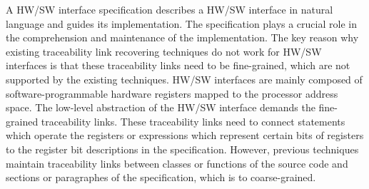 A HW/SW interface specification describes a HW/SW interface in natural language and guides its implementation.
The specification plays a crucial role in the comprehension and maintenance of the implementation.
The key reason why existing traceability link recovering techniques do not work for HW/SW interfaces is that these traceability links need to be fine-grained,
which are not supported by the existing techniques.
HW/SW interfaces are mainly composed of software-programmable hardware registers mapped to the processor address space.
The low-level abstraction of the HW/SW interface demands the fine-grained traceability links.
These traceability links need to connect statements which operate the registers or expressions which represent certain bits of registers to the register bit descriptions in the specification. However, previous techniques maintain traceability links between classes or functions of the source code and sections or paragraphes of the specification, which is to coarse-grained.



